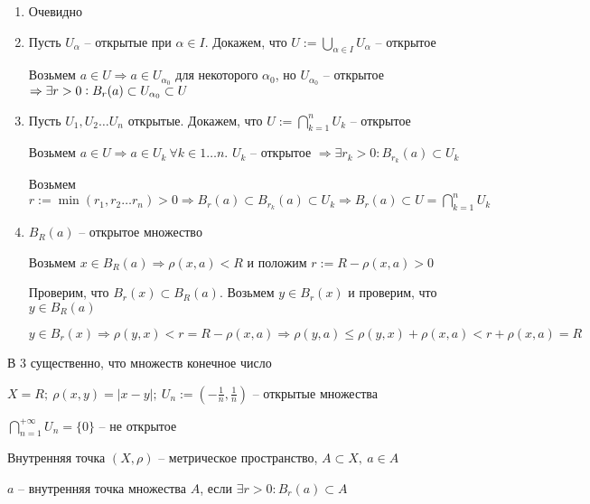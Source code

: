 \documentclass[12pt]{article}
\begin{document}
\begin{enumerate}
    \item Очевидно
    \item Пусть $U_\alpha$ -- открытые при $\alpha \in I$. Докажем, что $U := \bigcup\limits_{\alpha \in I} U_\alpha$ -- открытое
    
    Возьмем $a \in U \Rightarrow a \in U_{\alpha_0}$ для некоторого $\alpha_0$, но $U_{\alpha_0}$ -- открытое $\Rightarrow \exists r > 0 : \\ B_r(a) \subset U_{\alpha_0} \subset U$

    \item Пусть $U_1, U_2 \ldots U_n$ открытые. Докажем, что $U := \bigcap\limits_{k = 1}^n U_k$ -- открытое
    
    Возьмем $a \in U \Rightarrow a \in U_k\ \forall k \in 1 \ldots n$. $U_k$ -- открытое $\Rightarrow \exists r_k > 0 : B_{r_k}(a) \subset U_k$

    Возьмем $r := \min(r_1, r_2 \ldots r_n) > 0 \Rightarrow B_r(a) \subset B_{r_k}(a) \subset U_k \Rightarrow B_r(a) \subset U = \bigcap\limits_{k = 1}^n U_k$

    \item $B_R(a)$ -- открытое множество
    
    Возьмем $x \in B_R(a) \Rightarrow \rho(x, a) < R$ и положим $r := R - \rho(x, a) > 0$

    Проверим, что $B_r(x) \subset B_R(a)$. Возьмем $y \in B_r(x)$ и проверим, что $y \in B_R(a)$

    $y \in B_r(x) \Rightarrow \rho(y, x) < r = R - \rho(x, a) \Rightarrow \rho(y, a) \leq \rho(y, x) + \rho(x, a) < r + \rho(x, a) = R$
\end{enumerate}

\begin{Remark}{}
    В 3 существенно, что множеств конечное число

    \begin{Example}{}
        $X = R;\ \rho(x, y) = |x - y|;\ U_n := (- \frac{1}{n}, \frac{1}{n})$ -- открытые множества

        $\bigcap\limits_{n = 1}^{+ \infty} U_n = \{0\}$ -- не открытое
    \end{Example}    
\end{Remark}

\begin{defin}{Внутренняя точка}
    $(X, \rho)$ -- метрическое пространство, $A \subset X,\ a \in A$

    $a$ -- внутренняя точка множества $A$, если $\exists r > 0 : B_r(a) \subset A$
\end{defin}
\end{document}
